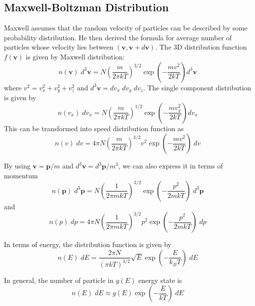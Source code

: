 \documentclass[../../../Main.tex]{subfiles}
\begin{document}
\subsection*{Maxwell-Boltzman Distribution} 
Maxwell assumes that the random velocity of particles can be described by some probability distribution. He then derived the formula for average number of particles whose velocity lies between $(\mathbf{v},\mathbf{v}+d\mathbf{v})$. The 3D distribution function $f(\mathbf{v})$ is given by Maxwell distribution:
\begin{equation*}
    n(\mathbf{v})\;d^3\mathbf{v}=N\left(\frac{m}{2\pi k T}\right)^{3/2}\exp\left(-\frac{m v^2}{2k T}\right)d^3\mathbf{v}
\end{equation*} 
where $v^2=v_x^2+v_y^2+v_z^2$ and $d^3\mathbf{v}=dv_x\; dv_y\; dv_z$. The single component distribution is given by 
\begin{equation*}
    n(v_x)\;dv_x=N\left(\frac{m}{2\pi k T}\right)^{1/2}\exp\left(-\frac{m v_x^2}{2k T}\right)dv_x
\end{equation*} This can be transformed into speed distribution function as 
\begin{equation*}
    n(v)\;dv=4\pi N\left(\frac{m}{2\pi k T}\right)^{3/2}v^2\exp\left(-\frac{m v^2}{2k T}\right)\;dv
\end{equation*}

By using $\mathbf{v}=\mathbf{p}/m$ and $d^3\mathbf{v}=d^3\mathbf{p}/m^3$, we can also express it in terms of momentum
\begin{equation*}
    n(\mathbf{p})\; d^3\mathbf{p}=N\left(\frac{1}{2\pi mkT}\right)^{3/2}\exp\left(-\frac{p^2}{2mkT}\right)\; d^3\mathbf{p}
\end{equation*}
and 
\begin{equation*}
    n(p)\; dp=4\pi N \left(\frac{1}{ 2\pi mkT}\right)^{3/2}p^2\exp\left(-\frac{p^2}{2mkT}\right)\;dp
\end{equation*}

In terms of energy, the distribution function is given by 
\begin{equation*}
    n(E)\;dE=\frac{2\pi N}{(\pi kT)^{3/2}}\sqrt{E}\exp\left(-\frac{E}{k_BT}\right)\;dE
\end{equation*}

In general, the number of particle in $g(E)$ energy state is 
\begin{equation*}
    n(E)\;dE\approx g(E)\exp\left(-\frac{E}{kT}\right)\;dE
\end{equation*}
\end{document}
